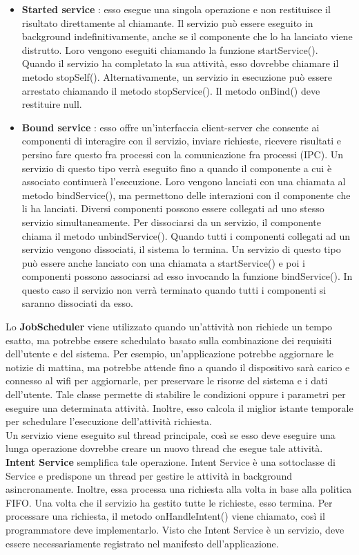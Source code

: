 \documentclass[12pt]{report}
\begin{document}
\begin{itemize}
\item \textbf{Started service} : esso esegue una singola operazione e non restituisce il risultato direttamente al chiamante. Il servizio può essere eseguito in background indefinitivamente, anche se il componente che lo ha lanciato viene distrutto. Loro vengono eseguiti chiamando la funzione startService(). Quando il servizio ha completato la sua attività, esso dovrebbe chiamare il metodo stopSelf(). Alternativamente, un servizio in esecuzione può essere arrestato chiamando il metodo stopService(). Il metodo onBind() deve restituire null.
\item \textbf{Bound service} : esso offre un'interfaccia client-server che consente ai componenti di interagire con il servizio, inviare richieste, ricevere risultati e persino fare questo fra processi con la comunicazione fra processi (IPC). Un servizio di questo tipo verrà eseguito fino a quando il componente a cui è associato continuerà l'esecuzione. Loro vengono lanciati con una chiamata al metodo bindService(), ma permettono delle interazioni con il componente che li ha lanciati. Diversi componenti possono essere collegati ad uno stesso servizio simultaneamente. Per dissociarsi da un servizio, il componente chiama il metodo unbindService(). Quando tutti i componenti collegati ad un servizio vengono dissociati, il sistema lo termina. Un servizio di questo tipo può essere anche lanciato con una chiamata a startService() e poi i componenti possono associarsi ad esso invocando la funzione bindService(). In questo caso il servizio non verrà terminato quando tutti i componenti si saranno dissociati da esso.
\end{itemize}
Lo \textbf{JobScheduler} viene utilizzato quando un'attività non richiede un tempo esatto, ma potrebbe essere schedulato basato sulla combinazione dei requisiti dell'utente e del sistema. Per esempio, un'applicazione potrebbe aggiornare le notizie di mattina, ma potrebbe attende fino a quando il dispositivo sarà carico e connesso al wifi per aggiornarle, per preservare le risorse del sistema e i dati dell'utente. Tale classe permette di stabilire le condizioni oppure i parametri per eseguire una determinata attività. Inoltre, esso calcola il miglior istante temporale per schedulare l'esecuzione dell'attività richiesta. \\Un servizio viene eseguito sul thread principale, così se esso deve eseguire una lunga operazione dovrebbe creare un nuovo thread che esegue tale attività. \textbf{Intent Service} semplifica tale operazione. Intent Service è una sottoclasse di Service e predispone un thread per gestire le attività in background asincronamente. Inoltre, essa processa una richiesta alla volta in base alla politica FIFO. Una volta che il servizio ha gestito tutte le richieste, esso termina. Per processare una richiesta, il metodo onHandleIntent() viene chiamato, così il programmatore deve implementarlo. Visto che Intent Service è un servizio, deve essere necessariamente registrato nel manifesto dell'applicazione.
\end{document}

